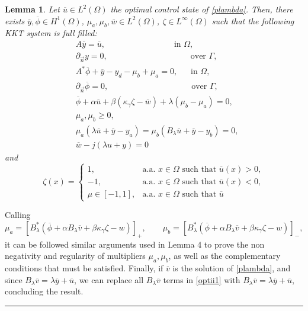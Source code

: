 \documentclass[11pt,a4paper]{amsart}
\newcommand{\kw}{\rule{2mm}{2mm}}
\newcommand{\om}{\Omega}
\renewenvironment{proof}{{Proof.}}{\hfill\kw}
\newtheorem{lemma}{{Lemma}}
\begin{document}
\begin{lemma}
Let $\overline{u}\in L^2(\om)$ the optimal control state of \eqref{plambda}. Then, there exists $\overline{y}, \overline{\phi}\in H^1(\om)$, $\mu_a,\mu_b, \overline{w}\in L^2(\om)$, $\zeta\in L^{\infty}(\om)$ such that the following KKT system is full filled:
\begin{equation}\label{opti3}
\begin{split}
	&A \overline y=\overline{u}, \qquad\qquad\qquad\qquad \; \mbox{in }\om,\\
	&\partial_{\vec{n}} y=0, \qquad\qquad\qquad\qquad\qquad \mbox{over }\Gamma,\\
	&A^*\overline{\phi}+\overline{y}-y_d-\mu_{b}+\mu_{a}=0,\quad \;\;\mbox{in }\om,\\
	&\partial_{\vec{n}}\overline{\phi}=0,\qquad\qquad\qquad\qquad\qquad \mbox{over }\Gamma,\\
	&\overline{\phi}+\alpha \overline{u}+\beta( \kappa_{\gamma}\zeta-\overline{w})+\lambda( \mu_b- \mu_a)=0,\\
	&\mu_{a}, \mu_{b}\ge 0,\\
	&\mu_{a}(\lambda\overline{u}+\overline{y}-y_a)=\mu_{b}(B_\lambda\overline{u}+\overline{y}-y_b)=0,\\
    &\overline{w}-j(\lambda u+y)=0
\end{split}
\end{equation}
and
\[
\zeta(x)=\begin{cases}
		1, & \mbox{a.a. }x\in \om \mbox{ such that } \overline{u}(x)>0,\\
		-1, & \mbox{a.a. }x\in \om \mbox{ such that } \overline{u}(x)<0,\\
		\mu \in [-1,1], &\mbox{a.a. }x\in \om \mbox{ such that } \overline{u}
  \end{cases}
\]
\end{lemma}

\begin{proof}
    Calling 
    \[
    \mu_a=[B_{\lambda}^*(\overline{\phi}+\alpha B_{\lambda}\overline{v}+\beta\kappa_{\gamma}\zeta-w)]_{+},\qquad
    \mu_b=[B_{\lambda}^*(\overline{\phi}+\alpha B_{\lambda}\overline{v}+\beta\kappa_{\gamma}\zeta-w)]_{-}, 
\]
it can be followed similar arguments used in Lemma 4 to prove the non negativity and regularity of multipliers $\mu_a, \mu_b$, as well as the complementary conditions that must be satisfied. Finally, if $\overline{v}$ is the solution of \eqref{plambda}, and since $B_{\lambda}\overline{v}=\lambda\overline{y}+\overline{u}$, we can replace all $B_{\lambda}\overline{v}$ terms in \eqref{optii1} with  $B_{\lambda}\overline{v}=\lambda\overline{y}+\overline{u}$, concluding the result. 
\end{proof}
\end{document}
